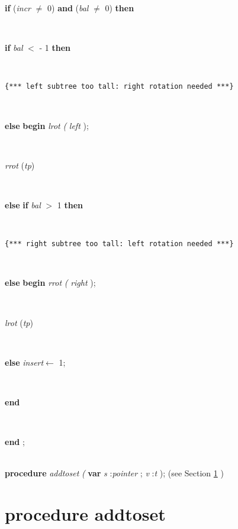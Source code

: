 \documentclass[10pt, a4paper]{article}
\begin{document}
\begin{tabbing}
\+\parbox{14cm}{\textsf {\textbf {if } \textsf{(\textit{incr} $\neq$ 0)} \textbf{ and } \textsf{(\textit{bal} $\neq$ 0)} \textbf{ then } }}\\
\+\parbox{14cm}{\textsf {\textbf {if } \textsf{\textit{bal} $<$  -  1 } \textbf{ then } }}\\
\parbox{14cm}{\texttt{\small{\{*** left subtree too tall: right rotation needed ***\}}}}\\
\<\parbox{14cm}{\textsf {\textbf {else } \textsf{    \textbf{begin}    \textit{lrot} \textit{(}  \textit{left}  );}}}\\
\<\-\parbox{14cm}{\textsf{\textit{rrot} (\textit{tp})}}\\
\+\parbox{14cm}{\textsf {\textbf {else }  \textbf{ if } \textsf{\textit{bal} $>$ 1} \textbf{ then } }}\\
\parbox{14cm}{\texttt{\small{\{*** right subtree too tall: left rotation needed ***\}}}}\\
\<\parbox{14cm}{\textsf {\textbf {else } \textsf{    \textbf{begin}    \textit{rrot} \textit{(}  \textit{right}  );}}}\\
\<\-\parbox{14cm}{\textsf{\textit{lrot} (\textit{tp})}}\\
\parbox{14cm}{\textsf {\textbf {else } \textsf{\textit{insert}$\leftarrow$ 1}; }}\\
\<\-\<\-\parbox{14cm}{\textsf{\textbf{end} }}\\
\<\-\parbox{14cm}{\textsf{\textbf{end} ;}}\\
\+\textsf{\textbf{procedure}  \textit{addtoset} \textit{(} \textbf{var}  \textit{s} :\textit{pointer} ; \textit{v} :\textit{t} );} (see Section \ref{sec:genericset/pointer2pset/setle/setge/setequals/setdifference/rec/setsymetricdifference/setintersection/rec/setunion/rec/isemptyset/emptyset/newset/find/isin/getlast/getright/getfirst/getleft/getnext/getnextnode/lrot/rrot/insertaddtoset} )\\
\end{tabbing}
\section{procedure addtoset}\label{sec:genericset/pointer2pset/setle/setge/setequals/setdifference/rec/setsymetricdifference/setintersection/rec/setunion/rec/isemptyset/emptyset/newset/find/isin/getlast/getright/getfirst/getleft/getnext/getnextnode/lrot/rrot/insertaddtoset}
\end{document}
